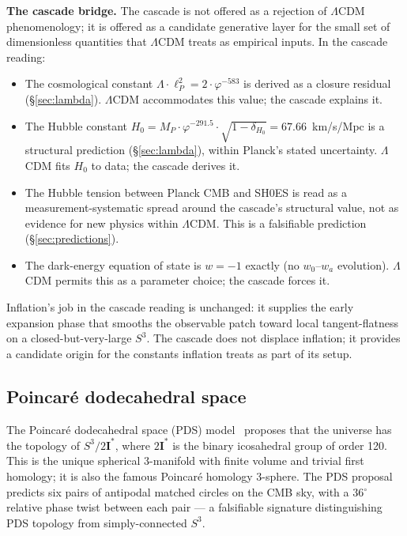 \documentclass[11pt]{article}
\theoremstyle{plain}
\theoremstyle{definition}
\theoremstyle{remark}
\newcommand{\twoI}{2\mathbf{I}}
\begin{document}
\medskip
\noindent\textbf{The cascade bridge.} The cascade is not offered as a rejection of $\Lambda$CDM phenomenology; it is offered as a candidate generative layer for the small set of dimensionless quantities that $\Lambda$CDM treats as empirical inputs. In the cascade reading:
\begin{itemize}[leftmargin=2em]
\item The cosmological constant $\Lambda \cdot \ell_P^2 = 2 \cdot \varphi^{-583}$ is derived as a closure residual (\S\ref{sec:lambda}). $\Lambda$CDM accommodates this value; the cascade explains it.
\item The Hubble constant $H_0 = M_P \cdot \varphi^{-291.5} \cdot \sqrt{1-\delta_{H_0}} = 67.66$~km/s/Mpc is a structural prediction (\S\ref{sec:lambda}), within Planck's stated uncertainty. $\Lambda$CDM fits $H_0$ to data; the cascade derives it.
\item The Hubble tension between Planck CMB and SH0ES is read as a measurement-systematic spread around the cascade's structural value, not as evidence for new physics within $\Lambda$CDM. This is a falsifiable prediction (\S\ref{sec:predictions}).
\item The dark-energy equation of state is $w = -1$ exactly (no $w_0$--$w_a$ evolution). $\Lambda$CDM permits this as a parameter choice; the cascade forces it.
\end{itemize}

Inflation's job in the cascade reading is unchanged: it supplies the early expansion phase that smooths the observable patch toward local tangent-flatness on a closed-but-very-large $S^3$. The cascade does not displace inflation; it provides a candidate origin for the constants inflation treats as part of its setup.

\subsection{Poincar\'e dodecahedral space}\label{sec:bridge-pds}

The Poincar\'e dodecahedral space (PDS) model~\citep{Luminet2003, AurichLustig2005, Caillerie2007} proposes that the universe has the topology of $S^3/\twoI^\ast$, where $\twoI^\ast$ is the binary icosahedral group of order 120. This is the unique spherical 3-manifold with finite volume and trivial first homology; it is also the famous Poincar\'e homology 3-sphere. The PDS proposal predicts six pairs of antipodal matched circles on the CMB sky, with a 36$^\circ$ relative phase twist between each pair --- a falsifiable signature distinguishing PDS topology from simply-connected $S^3$.
\end{document}
